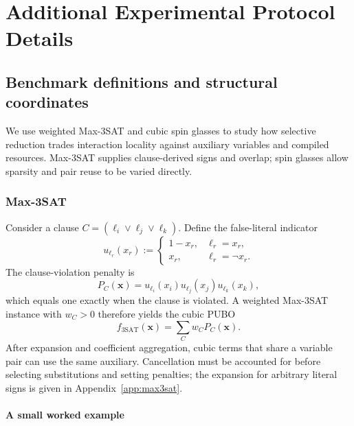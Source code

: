 \documentclass[a4paper,onecolumn,11pt,unpublished]{quantumarticle}
\theoremstyle{remark}
\begin{document}
\section{Additional Experimental Protocol Details}
\label{app:experimental-details}

\subsection{Benchmark definitions and structural coordinates}
\label{sec:applications}

We use weighted Max-3SAT and cubic spin glasses to study how selective
reduction trades interaction locality against auxiliary variables and compiled
resources. Max-3SAT supplies clause-derived signs and overlap; spin glasses
allow sparsity and pair reuse to be varied directly.

\subsubsection{Max-3SAT}

Consider a clause $C=(\ell_i\lor\ell_j\lor\ell_k)$. Define the false-literal indicator
\begin{equation}
    u_{\ell_r}(x_r)
    :=\begin{cases}
       1-x_r, & \ell_r=x_r,\\
       x_r, & \ell_r=\neg x_r.
    \end{cases}
    \label{eq:false-indicator}
\end{equation}
The clause-violation penalty is
\begin{equation}
    P_C(\bm x)=u_{\ell_i}(x_i)u_{\ell_j}(x_j)u_{\ell_k}(x_k),
    \label{eq:clause-penalty}
\end{equation}
which equals one exactly when the clause is violated. A weighted Max-3SAT
instance with $w_C>0$ therefore yields the cubic PUBO~\cite{Nagies2025,Nusslein2023}
\begin{equation}
    f_{\mathrm{3SAT}}(\bm x)=\sum_{C}w_CP_C(\bm x).
    \label{eq:max3sat-pubo}
\end{equation}
After expansion and coefficient aggregation, cubic terms that share a variable
pair can use the same auxiliary. Cancellation must be accounted for before
selecting substitutions and setting penalties; the expansion for arbitrary
literal signs is given in Appendix~\ref{app:max3sat}.

\paragraph{A small worked example}
\label{sec:max3sat-worked-example}
\end{document}
